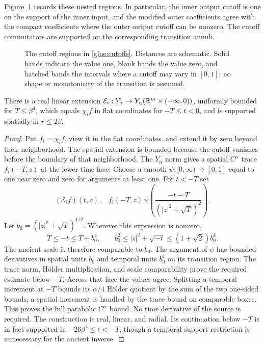 Figure~\ref{fig:cutoffs} records these nested regions. In particular,
the inner output cutoff is one on the support of the inner input,
and the modified outer coefficients agree with the compact coefficients
where the outer output cutoff can be nonzero. The cutoff commutators are supported on the corresponding transition
annuli.

\begin{figure}[htbp]
\centering

\caption{The cutoff regions in \eqref{glue:cutoffs}. Distances are
schematic. Solid bands indicate the value one, blank bands the value
zero, and hatched bands the intervals where a cutoff may vary in
$[0,1]$; no shape or monotonicity of the transition is assumed.}
\label{fig:cutoffs}
\end{figure}

\begin{lemma}\label{glue:extension}
There is a real linear extension $\mathcal E_i:Y_\alpha\to
Y_\alpha(\mathbb{R}^m\times(-\infty,0))$, uniformly bounded for
$T\le\beta^4$, which equals $\chi_i f$ in flat coordinates for
$-T\le t<0$, and is supported spatially in $r\le2\beta$.
\end{lemma}

\begin{proof}
Put $f_i=\chi_i f$, view it in the flat coordinates, and extend it by
zero beyond their neighborhood.  The spatial extension is bounded
because the cutoff vanishes before the boundary of that neighborhood.
The $Y_\alpha$ norm gives a spatial $C^\alpha$ trace $f_i(-T,z)$ at
the lower time face.  Choose a smooth $\psi:[0,\infty)\to[0,1]$ equal
to one near zero and zero for arguments at least one.  For $t<-T$ set
\begin{equation}\label{glue:extension-formula}
 (\mathcal E_i f)(t,z)
 =f_i(-T,z)\,\psi\left(\frac{-t-T}{(|z|^2+\sqrt T)^2}\right).
\end{equation}
Let $b_0=(|z|^2+\sqrt T)^{1/2}$.  Wherever this expression is
nonzero,
\[
 T\le-t\le T+b_0^4,
 \qquad b_0^2\le |z|^2+\sqrt{-t}\le(1+\sqrt2)b_0^2.
\]
The ancient scale is therefore comparable to $b_0$.  The argument of
$\psi$ has bounded derivatives in spatial units $b_0$ and temporal
units $b_0^4$ on its transition region.  The trace norm, H\"older
multiplication, and scale comparability prove the required estimate
below $-T$.  Across that face the values agree.  Splitting a temporal
increment at $-T$ bounds its $\alpha/4$ H\"older quotient by the sum
of the two one-sided bounds; a spatial increment is handled by the
trace bound on comparable boxes.  This proves the full parabolic
$C^\alpha$ bound.  No time derivative of the source is required.
The construction is real, linear, and radial.  Its continuation below
$-T$ is in fact supported in $-26\beta^4\le t<-T$, though a temporal
support restriction is unnecessary for the ancient inverse.
\end{proof}


